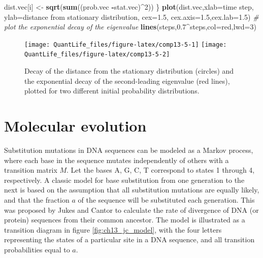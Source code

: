 \documentclass[
]{book}
\newenvironment{Shaded}{\begin{snugshade}}{\end{snugshade}}
\newcommand{\CommentTok}[1]{\textcolor[rgb]{0.56,0.35,0.01}{\textit{#1}}}
\newcommand{\DataTypeTok}[1]{\textcolor[rgb]{0.13,0.29,0.53}{#1}}
\newcommand{\DecValTok}[1]{\textcolor[rgb]{0.00,0.00,0.81}{#1}}
\newcommand{\FloatTok}[1]{\textcolor[rgb]{0.00,0.00,0.81}{#1}}
\newcommand{\KeywordTok}[1]{\textcolor[rgb]{0.13,0.29,0.53}{\textbf{#1}}}
\newcommand{\NormalTok}[1]{#1}
\newcommand{\OperatorTok}[1]{\textcolor[rgb]{0.81,0.36,0.00}{\textbf{#1}}}
\newcommand{\StringTok}[1]{\textcolor[rgb]{0.31,0.60,0.02}{#1}}
\theoremstyle{definition}
\theoremstyle{definition}
\theoremstyle{definition}
\theoremstyle{remark}
\begin{document}
\begin{Shaded}
\begin{Highlighting}[]
\NormalTok{  dist.vec[i] \textless{}{-}}\StringTok{ }\KeywordTok{sqrt}\NormalTok{(}\KeywordTok{sum}\NormalTok{((prob.vec }\OperatorTok{{-}}\NormalTok{stat.vec)}\OperatorTok{\^{}}\DecValTok{2}\NormalTok{))}
\NormalTok{\}}
\KeywordTok{plot}\NormalTok{(dist.vec,}\DataTypeTok{xlab=}\StringTok{\textquotesingle{}time step\textquotesingle{}}\NormalTok{, }\DataTypeTok{ylab=}\StringTok{\textquotesingle{}distance from stationary distribution\textquotesingle{}}\NormalTok{, }\DataTypeTok{cex=}\FloatTok{1.5}\NormalTok{, }\DataTypeTok{cex.axis=}\FloatTok{1.5}\NormalTok{,}\DataTypeTok{cex.lab=}\FloatTok{1.5}\NormalTok{)}
 \CommentTok{\# plot the exponential decay of the eigenvalue}
\KeywordTok{lines}\NormalTok{(steps,}\FloatTok{0.7}\OperatorTok{\^{}}\NormalTok{steps,}\DataTypeTok{col=}\StringTok{\textquotesingle{}red\textquotesingle{}}\NormalTok{,}\DataTypeTok{lwd=}\DecValTok{3}\NormalTok{)}
\end{Highlighting}
\end{Shaded}

\begin{figure}

{\centering \texttt{[image: QuantLife\_files/figure-latex/comp13-5-1]} \texttt{[image: QuantLife\_files/figure-latex/comp13-5-2]} 

}

\caption{Decay of the distance from the stationary distribution (circles) and the exponential decay of the second-leading eigenvalue (red lines), plotted for two different initial probability distributions.}\label{fig:comp13-5}
\end{figure}

\hypertarget{molecular-evolution}{%
\section{Molecular evolution}\label{molecular-evolution}}

Substitution mutations in DNA sequences can be modeled as a Markov process, where each base in the sequence mutates independently of others with a transition matrix \(M\). Let the bases A, G, C, T correspond to states 1 through 4, respectively. A classic model for base substitution from one generation to the next is based on the assumption that all substitution mutations are equally likely, and that the fraction \(a\) of the sequence will be substituted each generation. This was proposed by Jukes and Cantor \citep{jukes_evolution_1969} to calculate the rate of divergence of DNA (or protein) sequences from their common ancestor. The model is illustrated as a transition diagram in figure \ref{fig:ch13_jc_model}, with the four letters representing the states of a particular site in a DNA sequence, and all transition probabilities equal to \(a\).
\end{document}
